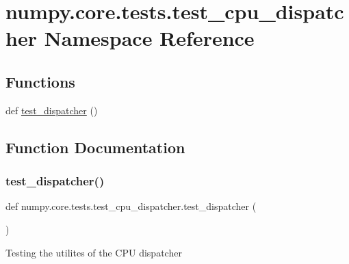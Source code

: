 \hypertarget{namespacenumpy_1_1core_1_1tests_1_1test__cpu__dispatcher}{}\section{numpy.\+core.\+tests.\+test\+\_\+cpu\+\_\+dispatcher Namespace Reference}
\label{namespacenumpy_1_1core_1_1tests_1_1test__cpu__dispatcher}
\subsection*{Functions}
\begin{DoxyCompactItemize}
\item 
def \hyperlink{namespacenumpy_1_1core_1_1tests_1_1test__cpu__dispatcher_ad7b92e3204b4ce048878157d460a9551}{test\+\_\+dispatcher} ()
\end{DoxyCompactItemize}


\subsection{Function Documentation}
\mbox{\label{namespacenumpy_1_1core_1_1tests_1_1test__cpu__dispatcher_ad7b92e3204b4ce048878157d460a9551}} 
\subsubsection{\texorpdfstring{test\+\_\+dispatcher()}{test\_dispatcher()}}
{\footnotesize\ttfamily def numpy.\+core.\+tests.\+test\+\_\+cpu\+\_\+dispatcher.\+test\+\_\+dispatcher (\begin{DoxyParamCaption}{ }\end{DoxyParamCaption})}

\begin{DoxyVerb}Testing the utilites of the CPU dispatcher
\end{DoxyVerb}
 